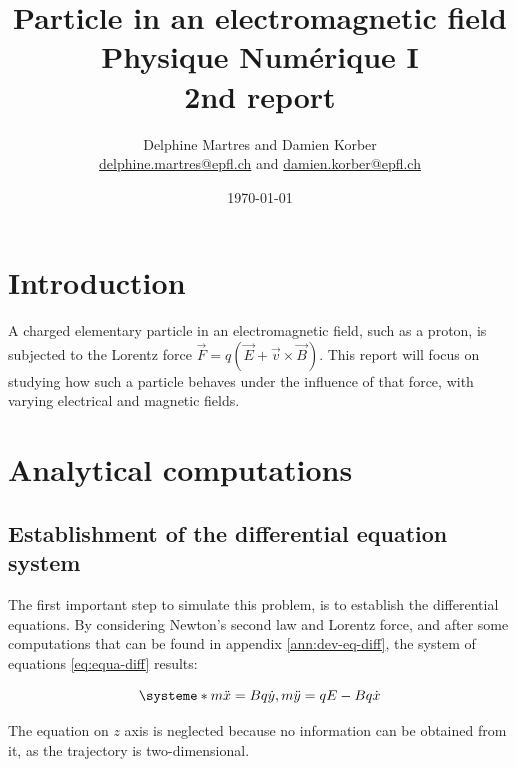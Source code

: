 \documentclass[a4paper,12pt,twoside]{article}
\newcommand{\mail}[1]{{\href{mailto:#1}{#1}}}
\begin{document}
\title{Particle in an electromagnetic field\\{\small Physique Numérique I}\\{\small 2nd report}}
\date{\today}
\author{Delphine Martres and Damien Korber\\{\small \mail{delphine.martres@epfl.ch} and \mail{damien.korber@epfl.ch}}}
\maketitle
\tableofcontents %

\baselineskip=16pt
\parindent=15pt
\parskip=5pt




\section{Introduction}
A charged elementary particle in an electromagnetic field, such as a proton, is subjected to the Lorentz force $\vec{F}=q(\vec{E} + \vec{v} \times \vec{B})$.
This report will focus on studying how such a particle behaves under the influence of that force, with varying electrical and magnetic fields.

\section{Analytical computations}
\subsection{Establishment of the differential equation system}
The first important step to simulate this problem, is to establish the differential equations.
By considering Newton's second law and Lorentz force, and after some computations that can be found in appendix \ref{ann:dev-eq-diff}, the system of equations \ref{eq:equa-diff} results:

\begin{equation}
\systeme*{m\ddot{x} = Bq\dot{y}, m\ddot{y} = qE - Bq\dot{x}}
\label{eq:equa-diff}
\end{equation}

The equation on $z$ axis is neglected because no information can be obtained from it, as the trajectory is two-dimensional.
\end{document}
